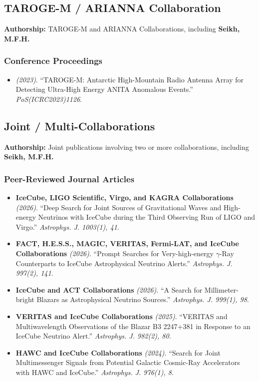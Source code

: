 \subsection{TAROGE-M / ARIANNA Collaboration}
\textbf{Authorship:} TAROGE-M and ARIANNA Collaborations, including \textbf{Seikh, M.F.H.}
\subsubsection{Conference Proceedings}
\begin{itemize}
\item \textit{(2023)}. ``TAROGE-M: Antarctic High-Mountain Radio Antenna Array for Detecting Ultra-High Energy ANITA Anomalous Events.'' \textit{PoS(ICRC2023)1126}. 
\end{itemize}
\medskip

\subsection{Joint / Multi-Collaborations}
\textbf{Authorship:} Joint publications involving two or more collaborations, including \textbf{Seikh, M.F.H.}
\subsubsection{Peer-Reviewed Journal Articles}
\begin{itemize}
\item \textbf{IceCube, LIGO Scientific, Virgo, and KAGRA Collaborations} \textit{(2026)}. ``Deep Search for Joint Sources of Gravitational Waves and High-energy Neutrinos with IceCube during the Third Observing Run of LIGO and Virgo.'' \textit{Astrophys. J. 1003(1), 41}.  
\item \textbf{FACT, H.E.S.S., MAGIC, VERITAS, Fermi-LAT, and IceCube Collaborations} \textit{(2026)}. ``Prompt Searches for Very-high-energy $\gamma$-Ray Counterparts to IceCube Astrophysical Neutrino Alerts.'' \textit{Astrophys. J. 997(2), 141}.  
\item \textbf{IceCube and ACT Collaborations} \textit{(2026)}. ``A Search for Millimeter-bright Blazars as Astrophysical Neutrino Sources.'' \textit{Astrophys. J. 999(1), 98}.  
\item \textbf{VERITAS and IceCube Collaborations} \textit{(2025)}. ``VERITAS and Multiwavelength Observations of the Blazar B3 2247+381 in Response to an IceCube Neutrino Alert.'' \textit{Astrophys. J. 982(2), 80}.  
\item \textbf{HAWC and IceCube Collaborations} \textit{(2024)}. ``Search for Joint Multimessenger Signals from Potential Galactic Cosmic-Ray Accelerators with HAWC and IceCube.'' \textit{Astrophys. J. 976(1), 8}.  
\end{itemize}
